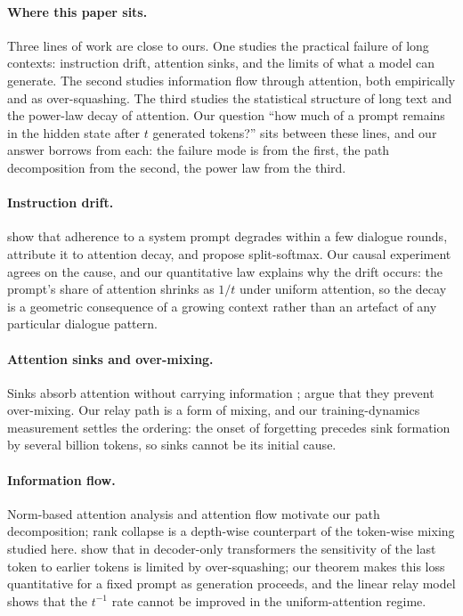 \documentclass[11pt]{article}
\theoremstyle{definition}
\theoremstyle{remark}
\begin{document}
\paragraph{Where this paper sits.} Three lines of work are close to ours. One studies the practical failure of long contexts: instruction drift, attention sinks, and the limits of what a model can generate. The second studies information flow through attention, both empirically and as over-squashing. The third studies the statistical structure of long text and the power-law decay of attention. Our question ``how much of a prompt remains in the hidden state after $t$ generated tokens?''  sits between these lines, and our answer borrows from each: the failure mode is from the first, the path decomposition from the second, the power law from the third.

\paragraph{Instruction drift.} \citet{li2024instability} show that adherence to a system prompt degrades within a few dialogue rounds, attribute it to attention decay, and propose split-softmax. Our causal experiment agrees on the cause, and our quantitative law explains why the drift occurs: the prompt's share of attention shrinks as $1/t$ under uniform attention, so the decay is a geometric consequence of a growing context rather than an artefact of any particular dialogue pattern.

\paragraph{Attention sinks and over-mixing.} Sinks absorb attention without carrying information \citep{xiao2024streaming,gu2025sink}; \citet{barbero2025first} argue that they prevent over-mixing. Our relay path is a form of mixing, and our training-dynamics measurement settles the ordering: the onset of forgetting precedes sink formation by several billion tokens, so sinks cannot be its initial cause.

\paragraph{Information flow.} Norm-based attention analysis \citep{kobayashi2020norm} and attention flow \citep{abnar2020flow} motivate our path decomposition; rank collapse \citep{dong2021rank} is a depth-wise counterpart of the token-wise mixing studied here. \citet{barbero2024glasses} show that in decoder-only transformers the sensitivity of the last token to earlier tokens is limited by over-squashing; our theorem makes this loss quantitative for a fixed prompt as generation proceeds, and the linear relay model shows that the $t^{-1}$ rate cannot be improved in the uniform-attention regime.
\end{document}
